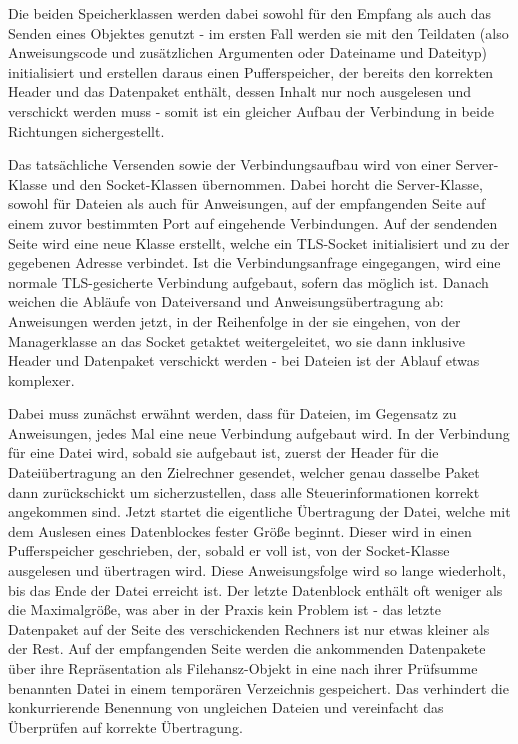 Die beiden Speicherklassen werden dabei sowohl für den Empfang als auch das Senden eines Objektes genutzt - im ersten Fall werden sie mit den Teildaten (also Anweisungscode und zusätzlichen Argumenten oder Dateiname und Dateityp) initialisiert und erstellen daraus einen Pufferspeicher, der bereits den korrekten Header und das Datenpaket enthält, dessen Inhalt nur noch ausgelesen und verschickt werden muss - somit ist ein gleicher Aufbau der Verbindung in beide Richtungen sichergestellt.\par
Das tatsächliche Versenden sowie der Verbindungsaufbau wird von einer Server-Klasse und den Socket-Klassen übernommen.
Dabei horcht die Server-Klasse, sowohl für Dateien als auch für Anweisungen, auf der empfangenden Seite auf einem zuvor bestimmten Port auf eingehende Verbindungen.
Auf der sendenden Seite wird eine neue Klasse erstellt, welche ein TLS-Socket initialisiert und zu der gegebenen Adresse verbindet.
Ist die Verbindungsanfrage eingegangen, wird eine normale TLS-gesicherte Verbindung aufgebaut, sofern das möglich ist. 
Danach weichen die Abläufe von Dateiversand und Anweisungsübertragung ab: Anweisungen werden jetzt, in der Reihenfolge in der sie eingehen, von der Managerklasse an das Socket getaktet weitergeleitet, wo sie dann inklusive Header und Datenpaket verschickt werden - bei Dateien ist der Ablauf etwas komplexer.\\\par
Dabei muss zunächst erwähnt werden, dass für Dateien, im Gegensatz zu Anweisungen, jedes Mal eine neue Verbindung aufgebaut wird.
In der Verbindung für eine Datei wird, sobald sie aufgebaut ist, zuerst der Header für die Dateiübertragung an den Zielrechner gesendet, welcher genau dasselbe Paket dann zurückschickt um sicherzustellen, dass alle Steuerinformationen korrekt angekommen sind.
Jetzt startet die eigentliche Übertragung der Datei, welche mit dem Auslesen eines Datenblockes fester Größe beginnt.
Dieser wird in einen Pufferspeicher geschrieben, der, sobald er voll ist, von der Socket-Klasse ausgelesen und übertragen wird. 
Diese Anweisungsfolge wird so lange wiederholt, bis das Ende der Datei erreicht ist.
Der letzte Datenblock enthält oft weniger als die Maximalgröße, was aber in der Praxis kein Problem ist - das letzte Datenpaket auf der Seite des verschickenden Rechners ist nur etwas kleiner als der Rest.
Auf der empfangenden Seite werden die ankommenden Datenpakete über ihre Repräsentation als Filehansz-Objekt in eine nach ihrer Prüfsumme benannten Datei in einem temporären Verzeichnis gespeichert. 
Das verhindert die konkurrierende Benennung von ungleichen Dateien und vereinfacht das Überprüfen auf korrekte Übertragung. 
